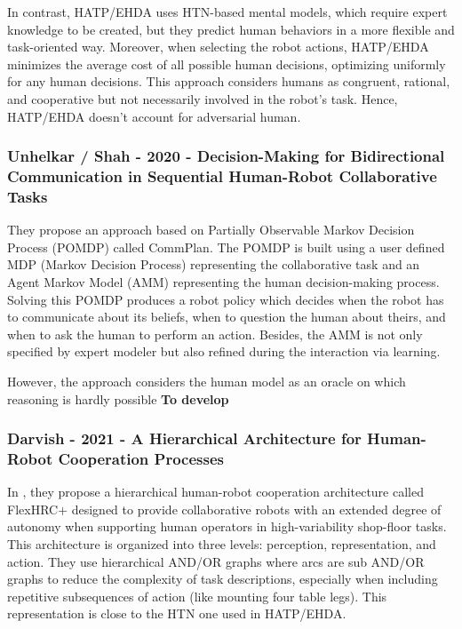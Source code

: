 In contrast, HATP/EHDA uses HTN-based mental models, which require expert knowledge to be created, but they predict human behaviors in a more flexible and task-oriented way.
Moreover, when selecting the robot actions, HATP/EHDA minimizes the average cost of all possible human decisions, optimizing uniformly for any human decisions. This approach considers humans as congruent, rational, and cooperative but not necessarily involved in the robot's task. Hence, HATP/EHDA doesn't account for adversarial human.

\subsubsection{Unhelkar / Shah - 2020 - Decision-Making for Bidirectional Communication in Sequential Human-Robot Collaborative Tasks}
\label{w5}

\cite{unhelkar2020decision}

They propose an approach based on Partially Observable Markov Decision Process (POMDP) called CommPlan. The POMDP is built using a user defined MDP (Markov Decision Process) representing the collaborative task and an Agent Markov Model (AMM) representing the human decision-making process. Solving this POMDP produces a robot policy which decides when the robot has to communicate about its beliefs, when to question the human about theirs, and when to ask the human to perform an action.
Besides, the AMM is not only specified by expert modeler but also refined during the interaction via learning. 

However, the approach considers the human model as an oracle on which reasoning is hardly possible \textbf{To develop}

\subsubsection{Darvish - 2021 - A Hierarchical Architecture for Human-Robot Cooperation Processes}
\label{w6}

In \cite{DarvishSMC21}, they propose a hierarchical human-robot cooperation architecture called FlexHRC+ designed to provide collaborative robots with an extended degree of autonomy when supporting human operators in high-variability shop-floor tasks. This architecture is organized into three levels: perception, representation, and action. 
They use hierarchical AND/OR graphs where arcs are sub AND/OR graphs to reduce the complexity of task descriptions, especially when including repetitive subsequences of action (like mounting four table legs). This representation is close to the HTN one used in HATP/EHDA. 

